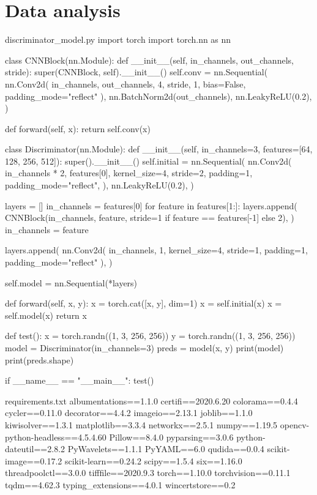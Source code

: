 \section{Data analysis}


discriminator_model.py 
import torch
import torch.nn as nn


class CNNBlock(nn.Module):
    def __init__(self, in_channels, out_channels, stride):
        super(CNNBlock, self).__init__()
        self.conv = nn.Sequential(
            nn.Conv2d(
                in_channels, out_channels, 4, stride, 1, bias=False, padding_mode="reflect"
            ),
            nn.BatchNorm2d(out_channels),
            nn.LeakyReLU(0.2),
        )

    def forward(self, x):
        return self.conv(x)


class Discriminator(nn.Module):
    def __init__(self, in_channels=3, features=[64, 128, 256, 512]):
        super().__init__()
        self.initial = nn.Sequential(
            nn.Conv2d(
                in_channels * 2,
                features[0],
                kernel_size=4,
                stride=2,
                padding=1,
                padding_mode="reflect",
            ),
            nn.LeakyReLU(0.2),
        )

        layers = []
        in_channels = features[0]
        for feature in features[1:]:
            layers.append(
                CNNBlock(in_channels, feature, stride=1 if feature == features[-1] else 2),
            )
            in_channels = feature

        layers.append(
            nn.Conv2d(
                in_channels, 1, kernel_size=4, stride=1, padding=1, padding_mode="reflect"
            ),
        )

        self.model = nn.Sequential(*layers)

    def forward(self, x, y):
        x = torch.cat([x, y], dim=1)
        x = self.initial(x)
        x = self.model(x)
        return x


def test():
    x = torch.randn((1, 3, 256, 256))
    y = torch.randn((1, 3, 256, 256))
    model = Discriminator(in_channels=3)
    preds = model(x, y)
    print(model)
    print(preds.shape)


if __name__ == "__main__":
    test()

requirements.txt
albumentations==1.1.0
certifi==2020.6.20
colorama==0.4.4
cycler==0.11.0
decorator==4.4.2
imageio==2.13.1
joblib==1.1.0
kiwisolver==1.3.1
matplotlib==3.3.4
networkx==2.5.1
numpy==1.19.5
opencv-python-headless==4.5.4.60
Pillow==8.4.0
pyparsing==3.0.6
python-dateutil==2.8.2
PyWavelets==1.1.1
PyYAML==6.0
qudida==0.0.4
scikit-image==0.17.2
scikit-learn==0.24.2
scipy==1.5.4
six==1.16.0
threadpoolctl==3.0.0
tifffile==2020.9.3
torch==1.10.0
torchvision==0.11.1
tqdm==4.62.3
typing_extensions==4.0.1
wincertstore==0.2


